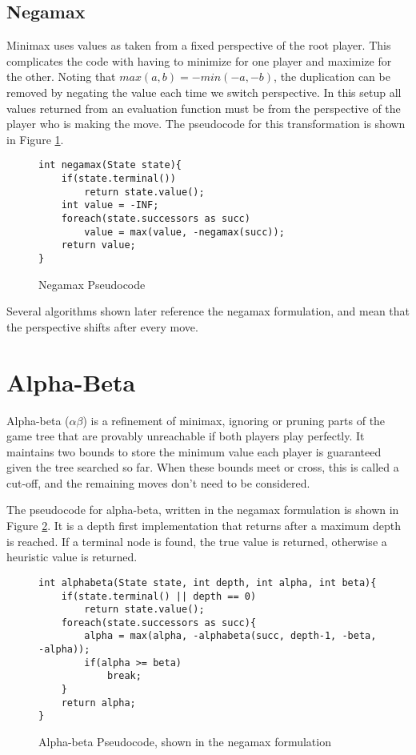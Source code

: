\subsection{Negamax}

Minimax uses values as taken from a fixed perspective of the root player. This complicates the code with having to minimize for one player and maximize for the other. Noting that $max(a,b) = −min(−a,-b)$, the duplication can be removed by negating the value each time we switch perspective. In this setup all values returned from an evaluation function must be from the perspective of the player who is making the move. The pseudocode for this transformation is shown in Figure \ref{fig:negamaxcode}.

\begin{figure}

\begin{lstlisting}
int negamax(State state){
	if(state.terminal())
		return state.value();
	int value = -INF;
	foreach(state.successors as succ)
		value = max(value, -negamax(succ));
	return value;
}
\end{lstlisting}

\caption{Negamax Pseudocode}
\label{fig:negamaxcode}
\end{figure}

Several algorithms shown later reference the negamax formulation, and mean that the perspective shifts after every move.


\section{Alpha-Beta}\label{sec:alphabeta}

Alpha-beta ($\alpha\beta$) is a refinement of minimax, ignoring or pruning parts of the game tree that are provably unreachable if both players play perfectly. It maintains two bounds to store the minimum value each player is guaranteed given the tree searched so far. When these bounds meet or cross, this is called a cut-off, and the remaining moves don't need to be considered. 

The pseudocode for alpha-beta, written in the negamax formulation is shown in Figure \ref{fig:abcode}. It is a depth first implementation that returns after a maximum depth is reached. If a terminal node is found, the true value is returned, otherwise a heuristic value is returned.

\begin{figure}

\begin{lstlisting}
int alphabeta(State state, int depth, int alpha, int beta){
	if(state.terminal() || depth == 0)
		return state.value();
	foreach(state.successors as succ){
		alpha = max(alpha, -alphabeta(succ, depth-1, -beta, -alpha));
		if(alpha >= beta)
			break;
	}
	return alpha;
}
\end{lstlisting}

\caption{Alpha-beta Pseudocode, shown in the negamax formulation}
\label{fig:abcode}
\end{figure}

